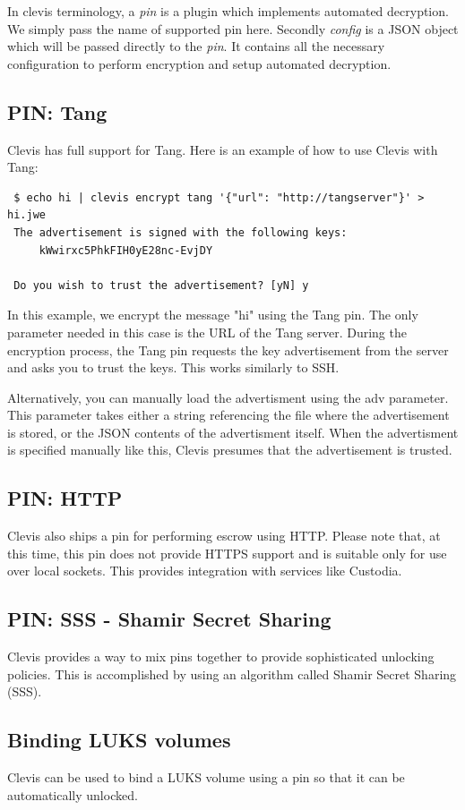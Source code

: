 In clevis terminology, a {\it pin} is a plugin which implements automated decryption.
We simply pass the name of supported pin here.
Secondly {\it config} is a JSON object which will be passed directly to the {\it pin}.
It contains all the necessary configuration to perform encryption and setup automated decryption.

\subsection{PIN: Tang}
Clevis has full support for Tang. Here is an example of how to use Clevis with Tang:
{\tt \begin{verbatim} $ echo hi | clevis encrypt tang '{"url": "http://tangserver"}' > hi.jwe
 The advertisement is signed with the following keys:
     kWwirxc5PhkFIH0yE28nc-EvjDY

 Do you wish to trust the advertisement? [yN] y\end{verbatim}
}
In this example, we encrypt the message "hi" using the Tang pin.
The only parameter needed in this case is the URL of the Tang server.
During the encryption process, the Tang pin requests the key advertisement from the server and asks you to trust the keys.
This works similarly to SSH.

Alternatively, you can manually load the advertisment using the adv parameter.
This parameter takes either a string referencing the file where the advertisement is stored, or the JSON contents of the advertisment itself.
When the advertisment is specified manually like this, Clevis presumes that the advertisement is trusted.
\subsection{PIN: HTTP}
Clevis also ships a pin for performing escrow using HTTP.
Please note that, at this time, this pin does not provide HTTPS support and is suitable only for use over local sockets.
This provides integration with services like Custodia.

\subsection{PIN: SSS - Shamir Secret Sharing}
Clevis provides a way to mix pins together to provide sophisticated unlocking policies.
This is accomplished by using an algorithm called Shamir Secret Sharing (SSS).

\subsection{Binding LUKS volumes}
Clevis can be used to bind a LUKS volume using a pin so that it can be automatically unlocked.

